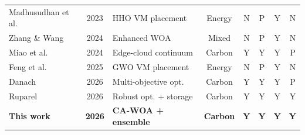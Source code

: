 \documentclass[12pt,a4paper]{article}
\providecommand{\DIFaddend}{} %
\DeclareRobustCommand{\DIFaddend}{\DIFOaddend \let\includegraphics\DIFOincludegraphics} %
\begin{document}
\begin{table}[H]
\begin{tabular}{@{}p{2.35cm}cp{1.9cm}ccccc@{}}
Madhusudhan et al. \cite{madhusudhan2023hho} & 2023 & HHO VM placement & Energy & N & P & Y & N \\
Zhang \& Wang \cite{zhang2024ewoa} & 2024 & Enhanced WOA & Mixed & N & P & Y & N \\
Miao et al. \cite{miao2024energy} & 2024 & Edge-cloud continuum & Carbon & Y & Y & Y & P \\
Feng et al. \cite{feng2025gwo} & 2025 & GWO VM placement & Energy & N & P & Y & N \\
Danach \cite{danach2026carbon} & 2026 & Multi-objective opt. & Carbon & Y & Y & Y & P \\
Ruparel \cite{ruparel2026carbon} & 2026 & Robust opt. + storage & Carbon & Y & Y & Y & Y \\
\midrule
\textbf{This work} & \textbf{2026} & \textbf{CA-WOA + ensemble} & \textbf{Carbon} & \textbf{Y} & \textbf{Y} & \textbf{Y} & \textbf{Y} \\
\bottomrule
\end{tabular}
\end{table}
\DIFaddend 
\end{document}
